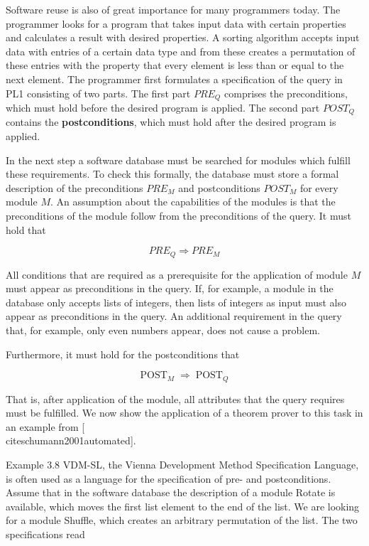\documentclass[10pt]{book}
\begin{document}
Software reuse is also of great importance for many programmers today. The programmer looks for a program that takes input data with certain properties and calculates a result with desired properties. A sorting algorithm accepts input data with entries of a certain data type and from these creates a permutation of these entries with the property that every element is less than or equal to the next element. The programmer first formulates a specification of the query in PL1 consisting of two parts. The first part $P R E_{Q}$ comprises the preconditions, which must hold before the desired program is applied. The second part $P O S T_{Q}$ contains the \textbf{postconditions}, which must hold after the desired program is applied.

In the next step a software database must be searched for modules which fulfill these requirements. To check this formally, the database must store a formal description of the preconditions $P R E_{M}$ and postconditions $P O S T_{M}$ for every module $M$. An assumption about the capabilities of the modules is that the preconditions of the module follow from the preconditions of the query. It must hold that

$$
P R E_{Q} \Rightarrow P R E_{M}
$$

All conditions that are required as a prerequisite for the application of module $M$ must appear as preconditions in the query. If, for example, a module in the database only accepts lists of integers, then lists of integers as input must also appear as preconditions in the query. An additional requirement in the query that, for example, only even numbers appear, does not cause a problem.

Furthermore, it must hold for the postconditions that

$$
\operatorname{POST}_{M} \Rightarrow \operatorname{POST}_{Q}
$$

That is, after application of the module, all attributes that the query requires must be fulfilled. We now show the application of a theorem prover to this task in an example from [\\cite{schumann2001automated}].

Example 3.8 VDM-SL, the Vienna Development Method Specification Language, is often used as a language for the specification of pre- and postconditions. Assume that in the software database the description of a module Rotate is available, which moves the first list element to the end of the list. We are looking for a module Shuffle, which creates an arbitrary permutation of the list. The two specifications read\\
\end{document}
